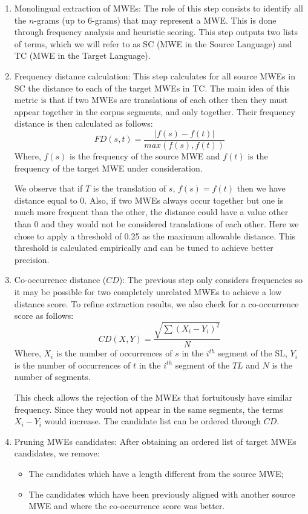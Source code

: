 \documentclass[output=paper,modfonts,nonflat]{langsci/langscibook}
\begin{document}
\begin{enumerate}
 \item Monolingual extraction of MWEs: The role of this step consists to identify all the $n$-grams (up to 6-grams) that may represent a MWE. This is done through frequency analysis and heuristic scoring. This step outputs two lists of terms, which we will refer to as SC (MWE in the Source Language) and TC (MWE in the Target Language).
 \item Frequency distance calculation: This step calculates for all source MWEs in SC the distance to each of the target MWEs in TC. The main idea of this metric is that if two MWEs are translations of each other then they must appear together in the corpus segments, and only together. Their frequency distance is then calculated as follows:
 \begin{equation}
  FD(s,t)=\frac{|f(s)-f(t)|}{max(f(s),f(t))}
 \end{equation}
 Where, $f(s)$ is the frequency of the source MWE and $f(t)$ is the frequency of the target MWE under consideration.

We observe that if $T$ is the translation of $s$, $f(s) = f(t) $ then we have distance equal to 0. 
Also, if two MWEs always occur together but one is much more frequent than the other, the distance could have a value other than 0 and they would not be considered translations of each other. 
Here we chose to apply a threshold of 0.25 as the maximum allowable distance. This threshold is calculated empirically and can be tuned to achieve better precision.

\item Co-occurrence distance ($CD$): The previous step only considers frequencies so it may be possible for two completely unrelated MWEs to achieve a low distance score. To refine extraction results, we also check for a co-occurrence score as follows:
\begin{equation}
  CD(X,Y)=\frac{\sqrt{\sum(X_i-Y_i)^2}}{N}
\end{equation}
Where, $X_i$ is the number of occurrences of $s$ in the $i^{th}$ segment of the SL, $Y_i$ is the number of occurrences of $t$ in the $i^{th}$ segment of the $TL$ and $N$ is the number of segments.

This check allows the rejection of the MWEs that fortuitously have similar frequency. Since they would not appear in the same segments, the terms $X_i-Y_i$ would increase. The candidate list can be ordered through $CD$.

\item Pruning MWEs candidates: After obtaining an ordered list of target MWEs candidates, we remove:
\begin{itemize}
 \item The candidates which have a length different from the source MWE;
 \item The candidates which have been previously aligned with another source MWE and where the co-occurrence score was better.
\end{itemize}
\end{enumerate}
\end{document}

